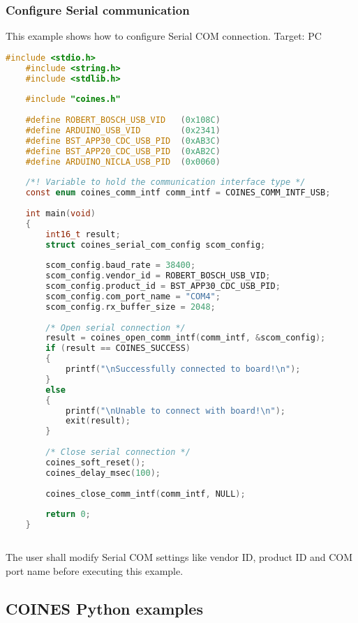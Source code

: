 \documentclass{article}
\begin{document}
\subsubsection{Configure Serial communication}\label{serialComConfig}
This example shows how to configure Serial COM connection.
\newline Target: PC
\begin{lstlisting}[language=c]
	#include <stdio.h>
	#include <string.h>
	#include <stdlib.h>
	
	#include "coines.h"
	
	#define ROBERT_BOSCH_USB_VID   (0x108C)
	#define ARDUINO_USB_VID        (0x2341)
	#define BST_APP30_CDC_USB_PID  (0xAB3C)
	#define BST_APP20_CDC_USB_PID  (0xAB2C)
	#define ARDUINO_NICLA_USB_PID  (0x0060)
	
	/*! Variable to hold the communication interface type */
	const enum coines_comm_intf comm_intf = COINES_COMM_INTF_USB;
	
	int main(void)
	{
		int16_t result;
		struct coines_serial_com_config scom_config;
	
		scom_config.baud_rate = 38400;
		scom_config.vendor_id = ROBERT_BOSCH_USB_VID;
		scom_config.product_id = BST_APP30_CDC_USB_PID;
		scom_config.com_port_name = "COM4";
		scom_config.rx_buffer_size = 2048;
	
		/* Open serial connection */
		result = coines_open_comm_intf(comm_intf, &scom_config);
		if (result == COINES_SUCCESS)
		{
			printf("\nSuccessfully connected to board!\n");
		}
		else
		{
			printf("\nUnable to connect with board!\n");
			exit(result);
		}
	
		/* Close serial connection */
		coines_soft_reset();
		coines_delay_msec(100);
	
		coines_close_comm_intf(comm_intf, NULL);
	
		return 0;
	}
	
\end{lstlisting}
The user shall modify Serial COM settings like vendor ID, product ID and COM port name before executing this example.
\subsection{COINES Python examples}
\end{document}
